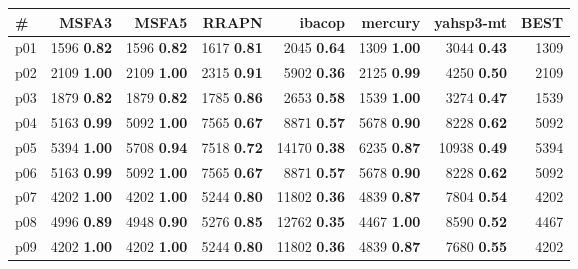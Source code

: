 \begin{tabular}{|l|rrrrrr|r|}
\hline
\textbf{\#} & \textbf{MSFA3} & \textbf{MSFA5} & \textbf{RRAPN} & \textbf{ibacop} & \textbf{mercury} & \textbf{yahsp3-mt} & \textbf{BEST}\\
\hline
p01 & {\footnotesize 1596} \textbf{0.82} & {\footnotesize 1596} \textbf{0.82} & {\footnotesize 1617} \textbf{0.81} & {\footnotesize 2045} \textbf{0.64} & {\footnotesize 1309} \textbf{1.00} & {\footnotesize 3044} \textbf{0.43} & 1309\\
p02 & {\footnotesize 2109} \textbf{1.00} & {\footnotesize 2109} \textbf{1.00} & {\footnotesize 2315} \textbf{0.91} & {\footnotesize 5902} \textbf{0.36} & {\footnotesize 2125} \textbf{0.99} & {\footnotesize 4250} \textbf{0.50} & 2109\\
p03 & {\footnotesize 1879} \textbf{0.82} & {\footnotesize 1879} \textbf{0.82} & {\footnotesize 1785} \textbf{0.86} & {\footnotesize 2653} \textbf{0.58} & {\footnotesize 1539} \textbf{1.00} & {\footnotesize 3274} \textbf{0.47} & 1539\\
p04 & {\footnotesize 5163} \textbf{0.99} & {\footnotesize 5092} \textbf{1.00} & {\footnotesize 7565} \textbf{0.67} & {\footnotesize 8871} \textbf{0.57} & {\footnotesize 5678} \textbf{0.90} & {\footnotesize 8228} \textbf{0.62} & 5092\\
p05 & {\footnotesize 5394} \textbf{1.00} & {\footnotesize 5708} \textbf{0.94} & {\footnotesize 7518} \textbf{0.72} & {\footnotesize 14170} \textbf{0.38} & {\footnotesize 6235} \textbf{0.87} & {\footnotesize 10938} \textbf{0.49} & 5394\\
p06 & {\footnotesize 5163} \textbf{0.99} & {\footnotesize 5092} \textbf{1.00} & {\footnotesize 7565} \textbf{0.67} & {\footnotesize 8871} \textbf{0.57} & {\footnotesize 5678} \textbf{0.90} & {\footnotesize 8228} \textbf{0.62} & 5092\\
p07 & {\footnotesize 4202} \textbf{1.00} & {\footnotesize 4202} \textbf{1.00} & {\footnotesize 5244} \textbf{0.80} & {\footnotesize 11802} \textbf{0.36} & {\footnotesize 4839} \textbf{0.87} & {\footnotesize 7804} \textbf{0.54} & 4202\\
p08 & {\footnotesize 4996} \textbf{0.89} & {\footnotesize 4948} \textbf{0.90} & {\footnotesize 5276} \textbf{0.85} & {\footnotesize 12762} \textbf{0.35} & {\footnotesize 4467} \textbf{1.00} & {\footnotesize 8590} \textbf{0.52} & 4467\\
p09 & {\footnotesize 4202} \textbf{1.00} & {\footnotesize 4202} \textbf{1.00} & {\footnotesize 5244} \textbf{0.80} & {\footnotesize 11802} \textbf{0.36} & {\footnotesize 4839} \textbf{0.87} & {\footnotesize 7680} \textbf{0.55} & 4202\\

\end{tabular}
